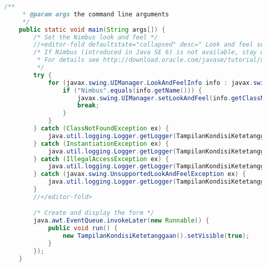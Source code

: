 \begin{lstlisting}[language=Java, caption=TampilanKondisiKetetanggaan.java]
    /**
     * @param args the command line arguments
     */
    public static void main(String args[]) {
        /* Set the Nimbus look and feel */
        //<editor-fold defaultstate="collapsed" desc=" Look and feel setting code (optional) ">
        /* If Nimbus (introduced in Java SE 6) is not available, stay with the default look and feel.
         * For details see http://download.oracle.com/javase/tutorial/uiswing/lookandfeel/plaf.html 
         */
        try {
            for (javax.swing.UIManager.LookAndFeelInfo info : javax.swing.UIManager.getInstalledLookAndFeels()) {
                if ("Nimbus".equals(info.getName())) {
                    javax.swing.UIManager.setLookAndFeel(info.getClassName());
                    break;
                }
            }
        } catch (ClassNotFoundException ex) {
            java.util.logging.Logger.getLogger(TampilanKondisiKetetanggaan.class.getName()).log(java.util.logging.Level.SEVERE, null, ex);
        } catch (InstantiationException ex) {
            java.util.logging.Logger.getLogger(TampilanKondisiKetetanggaan.class.getName()).log(java.util.logging.Level.SEVERE, null, ex);
        } catch (IllegalAccessException ex) {
            java.util.logging.Logger.getLogger(TampilanKondisiKetetanggaan.class.getName()).log(java.util.logging.Level.SEVERE, null, ex);
        } catch (javax.swing.UnsupportedLookAndFeelException ex) {
            java.util.logging.Logger.getLogger(TampilanKondisiKetetanggaan.class.getName()).log(java.util.logging.Level.SEVERE, null, ex);
        }
        //</editor-fold>

        /* Create and display the form */
        java.awt.EventQueue.invokeLater(new Runnable() {
            public void run() {
                new TampilanKondisiKetetanggaan().setVisible(true);
            }
        });
    }


\end{lstlisting}
